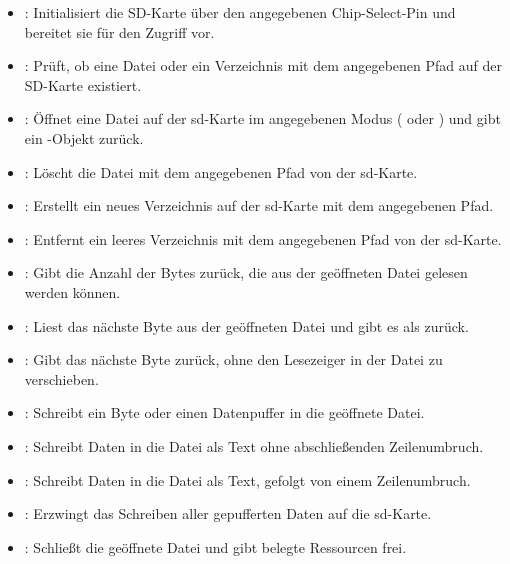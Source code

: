 \begin{itemize}
    \item {}: Initialisiert die SD-Karte über den angegebenen Chip-Select-Pin und bereitet sie für den Zugriff vor.
    \item {}: Prüft, ob eine Datei oder ein Verzeichnis mit dem angegebenen Pfad auf der SD-Karte existiert.
    \item {}: Öffnet eine Datei auf der \acs{sd}-Karte im angegebenen Modus ( oder ) und gibt ein -Objekt zurück.
    \item {}: Löscht die Datei mit dem angegebenen Pfad von der \acs{sd}-Karte.
    \item {}: Erstellt ein neues Verzeichnis auf der \acs{sd}-Karte mit dem angegebenen Pfad.  
    \item {}: Entfernt ein leeres Verzeichnis mit dem angegebenen Pfad von der \acs{sd}-Karte.
    \\
    \item {}: Gibt die Anzahl der Bytes zurück, die aus der geöffneten Datei gelesen werden können.
    \item {}: Liest das nächste Byte aus der geöffneten Datei und gibt es als  zurück.
    \item {}: Gibt das nächste Byte zurück, ohne den Lesezeiger in der Datei zu verschieben.
    \item {}: Schreibt ein Byte oder einen Datenpuffer in die geöffnete Datei.
    \item {}: Schreibt Daten in die Datei als Text ohne abschließenden Zeilenumbruch.
    \item {}: Schreibt Daten in die Datei als Text, gefolgt von einem Zeilenumbruch.
    \item {}: Erzwingt das Schreiben aller gepufferten Daten auf die \acs{sd}-Karte.
    \item {}: Schließt die geöffnete Datei und gibt belegte Ressourcen frei. 
\end{itemize}


